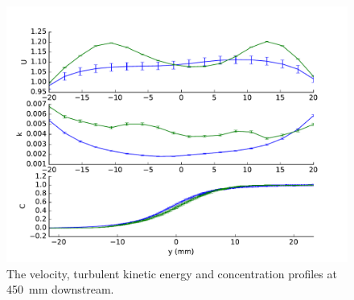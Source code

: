 \documentclass[11 pt]{article}
\begin{document}
\begin{appendices}
\begin{figure}[h]
			\includegraphics[width=\textwidth]{three_450.pdf}
			\caption{The velocity, turbulent kinetic energy and concentration profiles at \SI{450}{mm} downstream. }
		\end{figure}

\end{appendices}

	
    \clearpage
	
\end{document}

